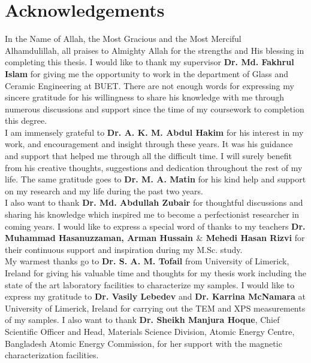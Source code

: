 \documentclass[main.tex]{subfiles}
\begin{document}
\chapter*{\vspace{-2cm}Acknowledgements}

\noindent In the Name of Allah, the Most Gracious and the Most Merciful\\

\noindent Alhamdulillah, all praises to Almighty Allah for the strengths and His blessing in completing this thesis.
I would like to thank my supervisor \textbf{Dr. Md. Fakhrul Islam} for giving me the opportunity to work in the department of Glass and Ceramic Engineering at BUET. There are not enough words for expressing my sincere gratitude for his willingness to share his knowledge with me through numerous discussions and support since the time of my coursework to completion this degree.\\

\noindent I am immensely grateful to \textbf{Dr. A. K. M. Abdul Hakim} for his interest in my work, and encouragement and insight through these years. It was his guidance and support that helped me through all the difficult time. I will surely benefit from his creative thoughts, suggestions and dedication throughout the rest of my life. The same gratitude goes to \textbf{Dr. M. A. Matin} for his kind help and support on my research and my life during the past two years.\\

\noindent I also want to thank \textbf{Dr. Md. Abdullah Zubair} for thoughtful discussions and sharing his knowledge which inspired me to become a perfectionist researcher in coming years. I would like to express a special word of thanks to my teachers \textbf{Dr. Muhammad Hasanuzzaman, Arman Hussain $\&$ Mehedi Hasan Rizvi} for their continuous support and inspiration during my M.Sc. study.\\

\noindent My warmest thanks go to \textbf{Dr. S. A. M. Tofail} from University of Limerick, Ireland for giving his valuable time and thoughts for my thesis work including the state of the art laboratory facilities to characterize my samples. I would like to express my gratitude to \textbf{Dr. Vasily Lebedev} and \textbf{Dr. Karrina McNamara} at University of Limerick, Ireland for carrying out the TEM and XPS measurements of my samples. I also want to thank \textbf{Dr. Sheikh Manjura Hoque}, Chief Scientific Officer and Head, Materials Science Division, Atomic Energy Centre, Bangladesh Atomic Energy Commission, for her support with the magnetic characterization facilities.\\
\end{document}
